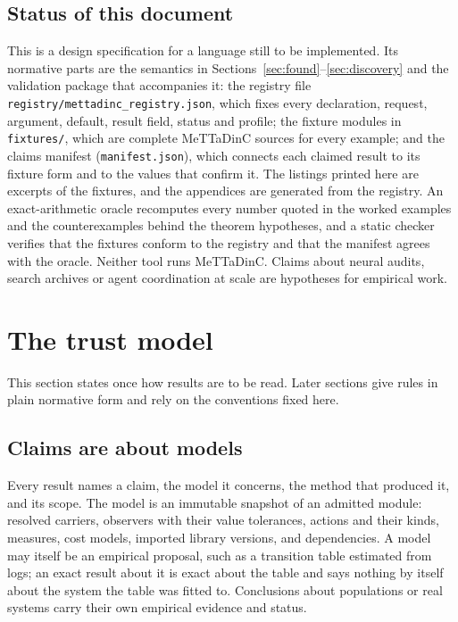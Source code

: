 \documentclass[11pt]{article}
\newcommand{\code}[1]{\texttt{#1}}
\theoremstyle{definition}
\theoremstyle{plain}
\begin{document}
\subsection{Status of this document}

This is a design specification for a language still to be implemented. Its normative parts are
the semantics in Sections~\ref{sec:found}--\ref{sec:discovery} and the validation package that accompanies it: the registry file \code{registry/mettadinc\_registry.json}, which fixes every
declaration, request, argument, default, result field, status and profile; the fixture modules in
\code{fixtures/}, which are complete MeTTaDinC sources for every example; and the claims manifest
(\code{manifest.json}), which connects each claimed result to its fixture form and to the values that
confirm it. The listings printed here are excerpts of the fixtures, and the appendices are
generated from the registry. An exact-arithmetic oracle recomputes every number quoted in the
worked examples and the counterexamples behind the theorem hypotheses, and a static checker
verifies that the fixtures conform to the registry and that the manifest agrees with the oracle.
Neither tool runs MeTTaDinC. Claims about neural audits, search archives or agent coordination at
scale are hypotheses for empirical work.

\section{The trust model}\label{sec:trust}

This section states once how results are to be read. Later sections give rules in plain
normative form and rely on the conventions fixed here.

\subsection{Claims are about models}

Every result names a claim, the model it concerns, the method that produced it, and its scope.
The model is an immutable snapshot of an admitted module: resolved carriers, observers with
their value tolerances, actions and their kinds, measures, cost models, imported library
versions, and dependencies. A model may itself be an empirical proposal, such as a transition
table estimated from logs; an exact result about it is exact about the table and says nothing by
itself about the system the table was fitted to. Conclusions about populations or real systems
carry their own empirical evidence and status.
\end{document}
